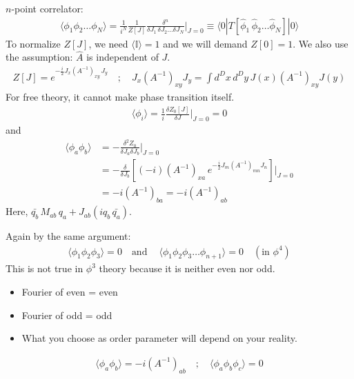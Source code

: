 \documentclass[14pt]{article} %
\begin{document}
$n$-point correlator:
\begin{align*}
\langle \phi_1 \phi_2 \dots \phi_N \rangle
= \frac{1}{i^N} \frac 1{Z[J]} \frac{\delta^n}{\delta J_1 \, \delta J_2 \dots \delta J_N} \bigg|_{J=0} \equiv \langle 0 | T [ \hat{\phi}_1 \, \hat{\phi}_2 \dots \hat{\phi}_N ] | 0 \rangle
\end{align*}
To normalize $Z[J]$, we need $\langle \mathbb{I} \rangle = 1$ and we will demand $Z[0] = 1$. We also use the assumption: $\hat{A}$ is independent of $J$.
\begin{align*}
Z[J] = e^{-\frac{i}{2} J_x (A^{-1})_{xy}\, J_y} \quad ; \quad J_x (A^{-1})_{xy} J_y = \int d^D x \, d^D y \, J(x) (A^{-1})_{xy} J(y)
\end{align*}
For free theory, it cannot make phase transition itself.
\begin{align*}
    \langle \phi_i \rangle = \frac{1}{i} \frac{\delta Z_0[J]}{\delta J} \Big|_{J=0} = 0
\end{align*}
and
\begin{align*}
    \langle \phi_a \phi_b \rangle 
    &= -\frac{\delta^2 Z_0}{\delta J_a \delta J_b} \Big|_{J=0} \\
    &= -\frac{\delta}{\delta J_b} \left[ (-i) (A^{-1})_{x a} \, e^{-\frac{i}{2} J_m (A^{-1})_{mn} J_n} \right] \bigg|_{J=0} \\
    &= -i (A^{-1})_{ba} = -i (A^{-1})_{ab}
\end{align*}
Here, $\bar{q_b}\, M_{ab}\, q_a + J_{ab} (i q_b\, \bar{q_a})$.

Again by the same argument:
\begin{align*}
    \langle \phi_1 \phi_2 \phi_3 \rangle = 0 \quad \text{and} ~\quad\langle \phi_1 \phi_2 \phi_3 \dots \phi_{n+1} \rangle = 0 \quad (\text{in } \phi^4)
\end{align*}
This is not true in $\phi^3$ theory because it is neither even nor odd.
\begin{tcolorbox}
\begin{itemize}
\item Fourier of even = even
\item Fourier of odd = odd
\item What you choose as order parameter will depend on your reality.
\end{itemize}
\end{tcolorbox}
\begin{align*}
    \langle \phi_a \phi_b \rangle = -i (A^{-1})_{ab} \quad  ; \quad \langle \phi_a \phi_b \phi_c \rangle = 0
\end{align*}
\end{document}
